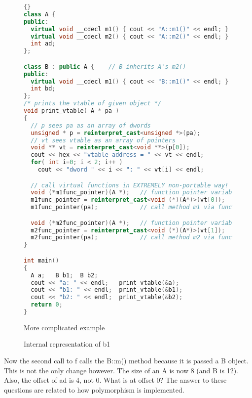 \begin{figure}[tp]
\begin{lstlisting}[language=C++, frame=tlrb]{}
class A {
public:
  virtual void __cdecl m1() { cout << "A::m1()" << endl; }
  virtual void __cdecl m2() { cout << "A::m2()" << endl; }
  int ad;
};

class B : public A {    // B inherits A's m2()
public:
  virtual void __cdecl m1() { cout << "B::m1()" << endl; }
  int bd;
};
/* prints the vtable of given object */
void print_vtable( A * pa )
{
  // p sees pa as an array of dwords
  unsigned * p = reinterpret_cast<unsigned *>(pa);
  // vt sees vtable as an array of pointers
  void ** vt = reinterpret_cast<void **>(p[0]);
  cout << hex << "vtable address = " << vt << endl;
  for( int i=0; i < 2; i++ )
    cout << "dword " << i << ": " << vt[i] << endl;

  // call virtual functions in EXTREMELY non-portable way!
  void (*m1func_pointer)(A *);   // function pointer variable
  m1func_pointer = reinterpret_cast<void (*)(A*)>(vt[0]);
  m1func_pointer(pa);            // call method m1 via function pointer

  void (*m2func_pointer)(A *);   // function pointer variable
  m2func_pointer = reinterpret_cast<void (*)(A*)>(vt[1]);
  m2func_pointer(pa);            // call method m2 via function pointer
}

int main()
{
  A a;   B b1;  B b2;
  cout << "a: " << endl;   print_vtable(&a);
  cout << "b1: " << endl;  print_vtable(&b1);
  cout << "b2: " << endl;  print_vtable(&b2);
  return 0;
}
\end{lstlisting}
\caption{ More complicated example \label{fig:2mEx}}
\end{figure}


\begin{figure}[tp]
\centering

\caption{Internal representation of {\code b1}\label{fig:vtable}}
\end{figure}

Now the second call to {\code f} calls the {\code B::m()} method because it
is passed a {\code B} object. This is not the only change however. The size
of an {\code A} is now 8 (and {\code B} is 12). Also, the offset of {\code
ad} is 4, not 0. What is at offset 0? The answer to these questions are related
to how polymorphism is implemented. 

